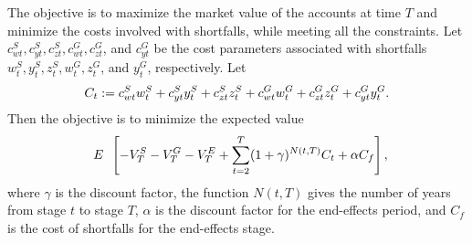 The objective is to maximize the market value of the accounts at time $T$ and minimize the costs involved with shortfalls, while meeting all the constraints.  Let $c^S_{wt}, c^S_{yt}, c^S_{zt}, c^G_{wt}, c^G_{zt}$, and $c^G_{yt}$ be the cost parameters associated with shortfalls $w^S_t, y^S_t, z^S_t, w^G_t, z^G_t$, and $y^G_t$, respectively.  Let
\[
C_t:= c^S_{wt}w^S_t + c^S_{yt} y^S_t + c^S_{zt}z^S_t + c^G_{wt}w^G_t +  c^G_{zt}z^G_t + c^G_{yt}y^G_t.
\]
Then the objective is to minimize the expected value
\begin{equation*}
\expect[] \left[-V^S_T - V^G_T - V^E_T + \sum_{t=2}^{T} (1+\gamma)^{N(t,T)} C_t + \alpha C_f\right],
\end{equation*}
where $\gamma$ is the discount factor, the function $N(t, T)$ gives the number of years from stage $t$ to stage $T$, $\alpha$ is the discount factor for the end-effects period, and $C_f$ is the cost of shortfalls for the end-effects stage.


